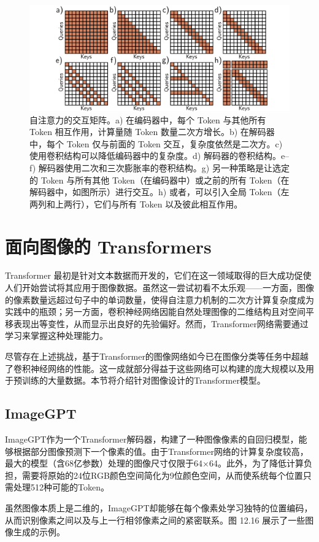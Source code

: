 \begin{figure}[ht!]
\centering
\includegraphics[width=0.7\linewidth]{png/chapter12/TransformerLongRange.png}
\caption{自注意力的交互矩阵。a) 在编码器中，每个 Token 与其他所有 Token 相互作用，计算量随 Token 数量二次方增长。b) 在解码器中，每个 Token 仅与前面的 Token 交互，复杂度依然是二次方。c) 使用卷积结构可以降低编码器中的复杂度。d) 解码器的卷积结构。e–f) 解码器使用二次和三次膨胀率的卷积结构。g) 另一种策略是让选定的 Token 与所有其他 Token（在编码器中）或之前的所有 Token（在解码器中，如图所示）进行交互。h) 或者，可以引入全局 Token（左两列和上两行），它们与所有 Token 以及彼此相互作用。}
\end{figure}

\section{面向图像的 Transformers}
Transformer 最初是针对文本数据而开发的，它们在这一领域取得的巨大成功促使人们开始尝试将其应用于图像数据。虽然这一尝试初看不太乐观——一方面，图像的像素数量远超过句子中的单词数量，使得自注意力机制的二次方计算复杂度成为实践中的瓶颈；另一方面，卷积神经网络因能自然处理图像的二维结构且对空间平移表现出等变性，从而显示出良好的先验偏好。然而，Transformer网络需要通过学习来掌握这种处理能力。

尽管存在上述挑战，基于Transformer的图像网络如今已在图像分类等任务中超越了卷积神经网络的性能。这一成就部分得益于这些网络可以构建的庞大规模以及用于预训练的大量数据。本节将介绍针对图像设计的Transformer模型。

\subsection{ImageGPT}
ImageGPT作为一个Transformer解码器，构建了一种图像像素的自回归模型，能够根据部分图像预测下一个像素的值。由于Transformer网络的计算复杂度较高，最大的模型（含68亿参数）处理的图像尺寸仅限于64×64。此外，为了降低计算负担，需要将原始的24位RGB颜色空间简化为9位颜色空间，从而使系统每个位置只需处理512种可能的Token。

虽然图像本质上是二维的，ImageGPT却能够在每个像素处学习独特的位置编码，从而识别像素之间以及与上一行相邻像素之间的紧密联系。图 12.16 展示了一些图像生成的示例。

